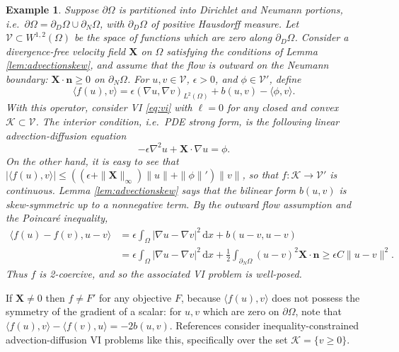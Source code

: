 \documentclass[letterpaper,final,12pt,reqno]{amsart}
\theoremstyle{cstyle}
\theoremstyle{cstyle*}
\theoremstyle{dstyle}
\newtheorem{example}[theorem]{Example}
\numberwithin{equation}{section}
\numberwithin{figure}{section}
\numberwithin{table}{section}
\numberwithin{theorem}{section}
\newcommand{\eps}{\epsilon}
\newcommand{\grad}{\nabla}
\newcommand{\bn}{\mathbf{n}}
\newcommand{\bX}{\mathbf{X}}
\newcommand{\cK}{\mathcal{K}}
\newcommand{\cV}{\mathcal{V}}
\newcommand{\ip}[2]{\langle#1,#2\rangle}
\newcommand{\dx}{\, \mathrm{d}x}
\begin{document}
\begin{example}  \label{ex:advectiondiffusion}  Suppose $\partial\Omega$ is partitioned into Dirichlet and Neumann portions, i.e.~$\partial\Omega = \partial_D\Omega \cup \partial_N\Omega$, with $\partial_D\Omega$ of positive Hausdorff measure.  Let $\cV \subset W^{1,2}(\Omega)$ be the space of functions which are zero along $\partial_D\Omega$.  Consider a divergence-free velocity field $\bX$ on $\Omega$ satisfying the conditions of Lemma \ref{lem:advectionskew}, and assume that the flow is outward on the Neumann boundary: $\bX \cdot \bn \ge 0$ on $\partial_N\Omega$.  For $u,v \in \cV$, $\eps>0$, and $\phi \in \cV'$, define
\begin{equation}
\ip{f(u)}{v} = \eps \left(\grad u, \grad v\right)_{L^2(\Omega)} + b(u,v) - \ip{\phi}{v}. \label{eq:advectiondiffusion}
\end{equation}
With this operator, consider VI \eqref{eq:vi} with $\ell = 0$ for any closed and convex $\cK \subset \cV$. The interior condition, i.e.~PDE strong form, is the following linear advection-diffusion equation
\begin{equation}
-\eps \grad^2 u + \bX\cdot \grad u = \phi.
\label{eq:advectiondiffusionstrong}
\end{equation}
On the other hand, it is easy to see that $|\ip{f(u)}{v}| \le \left((\eps + \|\bX\|_\infty) \|u\| + \|\phi\|'\right) \|v\|$, so that $f:\cK \to \cV'$ is continuous.  Lemma \ref{lem:advectionskew} says that the bilinear form $b(u,v)$ is skew-symmetric up to a nonnegative term.  By the outward flow assumption and the Poincar\'e inequality,
\begin{align*}
\ip{f(u)-f(v)}{u-v} &= \eps \int_\Omega |\grad u - \grad v|^2\dx + b(u-v,u-v) \\
                    &= \eps \int_\Omega |\grad u - \grad v|^2\dx + \frac{1}{2} \int_{\partial_N\Omega} (u-v)^2 \bX\cdot\bn \ge \eps C \|u-v\|^2.
\end{align*}
Thus $f$ is 2-coercive, and so the associated VI problem is well-posed.
\end{example}

If $\bX \ne 0$ then $f\ne F'$ for any objective $F$, because $\ip{f(u)}{v}$ does not possess the symmetry of the gradient of a scalar: for $u,v$ which are zero on $\partial \Omega$, note that $\ip{f(u)}{v} - \ip{f(v)}{u} = -2 b(u,v)$.  References \cite{Bueler2021conservation,ChangNakshatrala2017} consider inequality-constrained advection-diffusion VI problems like this, specifically over the set $\cK = \{v\ge 0\}$.
\end{document}
